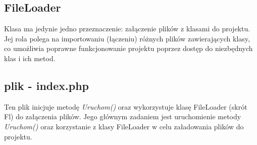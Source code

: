 \subsection{FileLoader}    
    Klasa ma jedynie jedno przeznaczenie: załączenie plików z klasami do projektu. Jej rola polega na importowaniu (łączeniu) różnych plików zawierających klasy, co umożliwia poprawne funkcjonowanie projektu poprzez dostęp do niezbędnych klas i ich metod.
      

\subsection{plik - index.php}    
    Ten plik inicjuje metodę \textit{Uruchom()} oraz wykorzystuje klasę FileLoader (skrót Fl) do załączenia plików. Jego głównym zadaniem jest uruchomienie metody \textit{Uruchom()} oraz korzystanie z klasy FileLoader w celu załadowania plików do projektu.
      
